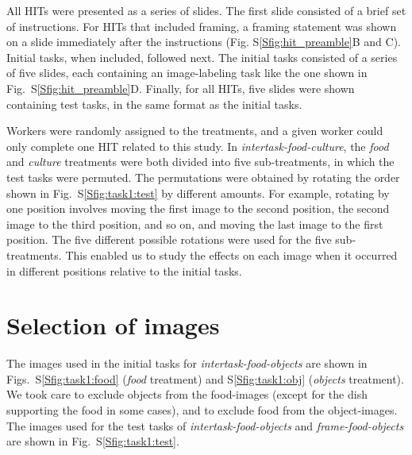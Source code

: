 \documentclass{pnastwo}
\begin{document}
\begin{article}
\begin{materials}
All HITs were presented as a series of slides.  The first slide consisted of a
brief set of instructions.  For HITs that included framing, a framing statement
was shown on a slide immediately after the instructions (Fig.
S\ref{Sfig:hit_preamble}B and C).  Initial tasks, when included, followed next.
The initial tasks consisted of a series of five slides, each containing an
image-labeling task like the one shown in Fig.~S\ref{Sfig:hit_preamble}D.
Finally, for all HITs, five slides were shown containing test tasks, in the
same format as the initial tasks.

Workers were randomly assigned to the treatments, and a given worker could only
complete one HIT related to this study.  In \textit{intertask-food-culture},
the \textit{food} and \textit{culture} treatments were both divided into five
sub-treatments, in which the test tasks were permuted.  The permutations were
obtained by rotating the order shown in Fig.~S\ref{Sfig:task1:test} by different
amounts.  For example, rotating by one position involves moving the first image
to the second position, the second image to the third position, and so on, and
moving the last image to the first position.  The five different possible
rotations were used for the five sub-treatments.  This enabled us to study the
effects on each image when it occurred in different positions relative to the
initial tasks.

\section{Selection of images} The images used in the initial tasks for
\textit{intertask-food-objects}  are shown in Figs.~S\ref{Sfig:task1:food}
(\textit{food} treatment) and S\ref{Sfig:task1:obj} (\textit{objects}
treatment).  We took care to exclude objects from the food-images (except for
the dish supporting the food in some cases), and to exclude food from the
object-images.  The images used for the test tasks of
\textit{intertask-food-objects} and \textit{frame-food-objects} are shown in
Fig.~S\ref{Sfig:task1:test}.


\end{materials}
\end{article}
\end{document}
